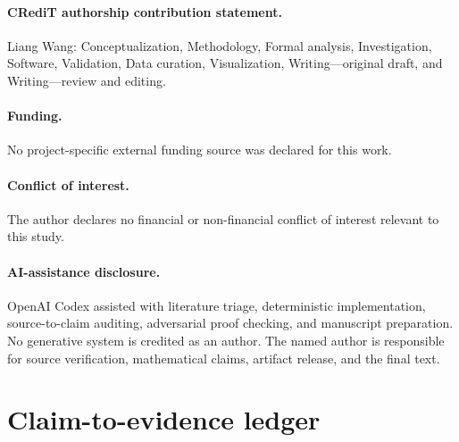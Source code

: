 \documentclass[11pt]{article}
\theoremstyle{definition}
\theoremstyle{remark}
\begin{document}
\paragraph{CRediT authorship contribution statement.}
Liang Wang: Conceptualization, Methodology, Formal analysis, Investigation,
Software, Validation, Data curation, Visualization, Writing---original draft,
and Writing---review and editing.

\paragraph{Funding.}
No project-specific external funding source was declared for this work.

\paragraph{Conflict of interest.}
The author declares no financial or non-financial conflict of interest
relevant to this study.

\paragraph{AI-assistance disclosure.}
OpenAI Codex assisted with literature triage, deterministic implementation,
source-to-claim auditing, adversarial proof checking, and manuscript
preparation.  No generative system is credited as an author.  The named
author is responsible for source verification, mathematical claims, artifact
release, and the final text.

\appendix
\section{Claim-to-evidence ledger}
\end{document}
